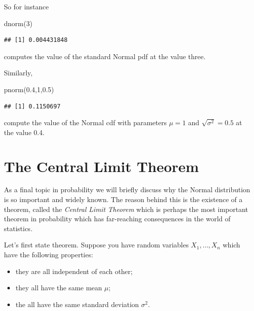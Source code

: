 \documentclass[
]{book}
\newenvironment{Shaded}{\begin{snugshade}}{\end{snugshade}}
\newcommand{\DecValTok}[1]{\textcolor[rgb]{0.00,0.00,0.81}{#1}}
\newcommand{\FloatTok}[1]{\textcolor[rgb]{0.00,0.00,0.81}{#1}}
\newcommand{\FunctionTok}[1]{\textcolor[rgb]{0.00,0.00,0.00}{#1}}
\newcommand{\NormalTok}[1]{#1}
\theoremstyle{definition}
\theoremstyle{definition}
\theoremstyle{definition}
\theoremstyle{definition}
\theoremstyle{remark}
\begin{document}
So for instance

\begin{Shaded}
\begin{Highlighting}[]
\FunctionTok{dnorm}\NormalTok{(}\DecValTok{3}\NormalTok{)}
\end{Highlighting}
\end{Shaded}

\begin{verbatim}
## [1] 0.004431848
\end{verbatim}

computes the value of the standard Normal pdf at the value three.

Similarly,

\begin{Shaded}
\begin{Highlighting}[]
\FunctionTok{pnorm}\NormalTok{(}\FloatTok{0.4}\NormalTok{,}\DecValTok{1}\NormalTok{,}\FloatTok{0.5}\NormalTok{)}
\end{Highlighting}
\end{Shaded}

\begin{verbatim}
## [1] 0.1150697
\end{verbatim}

compute the value of the Normal cdf with parameters \(\mu=1\) and \(\sqrt{\sigma^2}=0.5\) at the value 0.4.

\hypertarget{the-central-limit-theorem}{%
\section{The Central Limit Theorem}\label{the-central-limit-theorem}}

As a final topic in probability we will briefly discuss why the Normal distribution is so important and widely known. The reason behind this is the existence of a theorem, called the \emph{Central Limit Theorem} which is perhaps the most important theorem in probability which has far-reaching consequences in the world of statistics.

Let's first state theorem. Suppose you have random variables \(X_1,\dots, X_n\) which have the following properties:

\begin{itemize}
\item
  they are all independent of each other;
\item
  they all have the same mean \(\mu\);
\item
  the all have the same standard deviation \(\sigma^2\).
\end{itemize}
\end{document}
